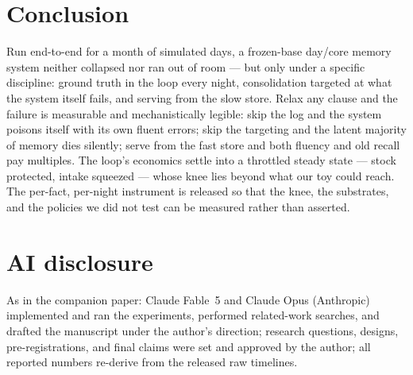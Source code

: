 \documentclass[11pt]{article}
\begin{document}
\section{Conclusion}

Run end-to-end for a month of simulated days, a frozen-base day/core memory system neither collapsed
nor ran out of room --- but only under a specific discipline: ground truth in the loop every night,
consolidation targeted at what the system itself fails, and serving from the slow store. Relax any
clause and the failure is measurable and mechanistically legible: skip the log and the system
poisons itself with its own fluent errors; skip the targeting and the latent majority of memory dies
silently; serve from the fast store and both fluency and old recall pay multiples. The loop's
economics settle into a throttled steady state --- stock protected, intake squeezed --- whose knee
lies beyond what our toy could reach. The per-fact, per-night instrument is released so that the
knee, the substrates, and the policies we did not test can be measured rather than asserted.

\section*{AI disclosure}
As in the companion paper: Claude Fable~5 and Claude Opus (Anthropic) implemented and ran the
experiments, performed related-work searches, and drafted the manuscript under the author's
direction; research questions, designs, pre-registrations, and final claims were set and approved by
the author; all reported numbers re-derive from the released raw timelines.
\end{document}
